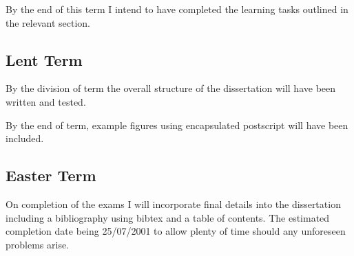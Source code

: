 \documentclass[12pt,a4paper, headings=standardclasses]{scrartcl}
\begin{document}
By the end of this term I intend to have completed the learning tasks 
outlined in the relevant section.


\subsection*{Lent Term}

By the division of term the overall structure of the dissertation
will have been written and tested.

By the end of term, example figures using encapsulated postscript
will have been included.
 

\subsection*{Easter Term}

On completion of the exams I will incorporate final details into 
the dissertation including a bibliography using bibtex and a table of contents.
The estimated completion date being 25/07/2001 to allow 
plenty of time should any unforeseen problems arise.
\end{document}
